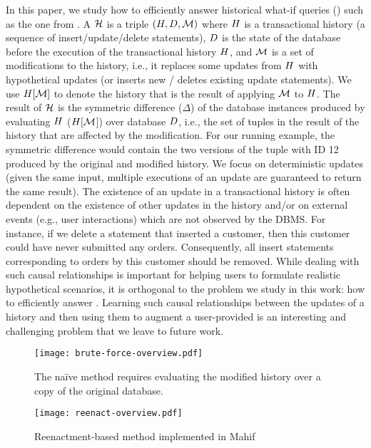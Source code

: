 In this paper, we study how to efficiently answer
historical what-if queries (\abbrHWs) such as the one from .
A \abbrHW $\mathcal{H}$ is a triple $(H, D, \mathcal{M})$ where $H$ is a transactional history (a sequence of insert/update/delete statements), $D$ is the state of the database before the execution of the transactional history $H$, and $\mathcal{M}$ is a set of modifications to the history, i.e., it replaces some updates from $H$ with hypothetical updates (or inserts new / deletes existing update statements). We use $H[\mathcal{M}]$ to denote the history that is the result of applying $\mathcal{M}$ to $H$. The result of $\mathcal{H}$ is the symmetric difference ($\Delta$) of the database instances produced by evaluating $H$ ($H[\mathcal{M}$]) over database $D$, i.e., the set of tuples in the result of the history that are affected by the modification. For our running example, the symmetric difference  would contain the two versions of the tuple with ID 12 produced by the original and modified history. We focus on deterministic updates (given the same input, multiple executions of an update are guaranteed to return the same result).
%
The existence of an update in a transactional history is often dependent on the existence of other updates in the history and/or on external events (e.g., user interactions) which are not observed by the DBMS. For instance, if we delete a statement that inserted a customer, then this customer could have never submitted any orders. Consequently, all insert statements corresponding to orders by this customer should be removed. While dealing with such causal relationships is important for helping users to formulate realistic hypothetical scenarios, it is orthogonal to the problem we study in this work: how to efficiently answer \abbrHWs. Learning such causal relationships between the updates of a history %
  and then using them to augment a user-provided \abbrHW is an interesting and challenging problem that we leave to future work.

\begin{figure}[t]
  \begin{minipage}{1.0\linewidth}
    \centering
    \texttt{[image: brute-force-overview.pdf]}
    \vspace{-4.5mm}
    \caption{The naïve method requires evaluating the modified history over a copy of the original database.}
    \label{fig:Naive-Method}
  \end{minipage}
  \begin{minipage}{1.0\linewidth}
    \centering
    \texttt{[image: reenact-overview.pdf]}
    \vspace{-4.5mm}
    \caption{Reenactment-based method implemented in Mahif}
    \label{fig:Prop-Method}
  \end{minipage}
\end{figure}


